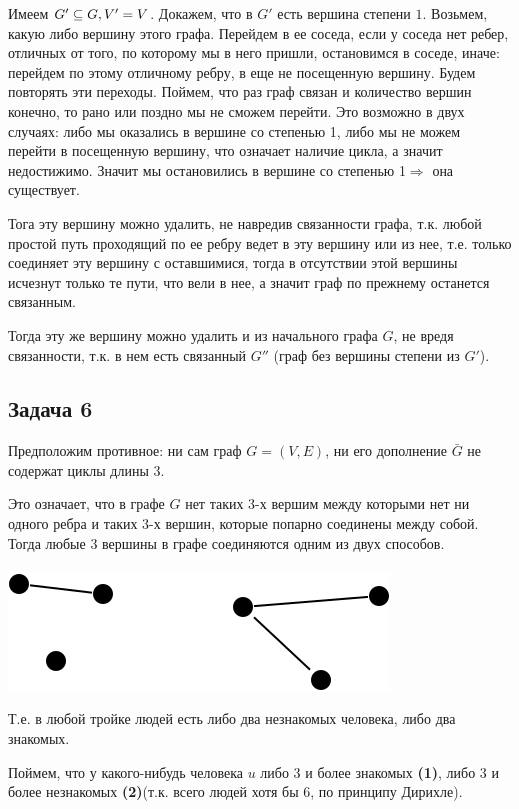 \documentclass{article}
\begin{document}
Имеем $ G' \subseteq G,\space V' = V $. 
Докажем, что в $ G' $ есть вершина степени $ 1 $.
Возьмем, какую либо вершину этого графа. Перейдем в ее соседа, если у соседа нет ребер, отличных от того, по которому мы в него пришли, остановимся в соседе, иначе: перейдем по этому отличному ребру, в еще не посещенную вершину. Будем повторять эти переходы. Поймем, что раз граф связан и количество вершин конечно, то рано или поздно мы не сможем перейти. Это возможно в двух случаях: либо мы оказались в вершине со степенью 1, либо мы не можем перейти в посещенную вершину, что означает наличие цикла, а значит недостижимо. Значит мы остановились в вершине со степенью 1$\Rightarrow$ она существует.

Тога эту вершину можно удалить, не навредив связанности графа, т.к. любой простой путь проходящий по ее ребру ведет в эту вершину или из нее, т.е. только соединяет эту вершину с оставшимися, тогда в отсутствии этой вершины исчезнут только те пути, что вели в нее, а значит граф по прежнему останется связанным.

Тогда эту же вершину можно удалить и из начального графа $G$, не вредя связанности, т.к. в нем есть связанный $G''$ (граф без вершины степени из $G'$). 
\begin{center}
	\subsection*{Задача 6}
\end{center}
Предположим противное: ни сам граф $ G = (V, E) $, ни его дополнение $ \bar{G} $ не содержат циклы длины $ 3 $.

Это означает, что в графе $ G $ нет таких 3-х вершим между которыми нет ни одного ребра и таких 3-х вершин, которые попарно соединены между собой.
Тогда любые 3 вершины в графе соединяются одним из двух способов.
\\
\\

\includegraphics[scale=0.5]{6_1.png} 


Т.е. в любой тройке людей есть либо два незнакомых человека, либо два знакомых. 

Поймем, что у какого-нибудь человека $u$ либо 3 и более знакомых \textbf{(1)}, либо 3 и более незнакомых \textbf{(2)}(т.к. всего людей хотя бы 6, по принципу Дирихле).
\end{document}
